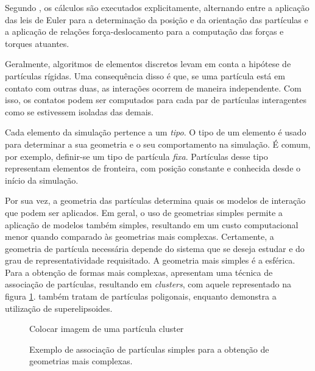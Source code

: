 Segundo , os cálculos são executados explicitamente, alternando entre a aplicação das leis de Euler para a determinação da posição e da orientação das partículas e a aplicação de relações força-deslocamento para a computação das forças e torques atuantes.

Geralmente, algoritmos de elementos discretos levam em conta a hipótese de partículas rígidas. Uma consequência disso é que, se uma partícula está em contato com outras duas, as interações ocorrem de maneira independente. Com isso, os contatos podem ser computados para cada par de partículas interagentes como se estivessem isoladas das demais.

Cada elemento da simulação pertence a um \textit{tipo}. O tipo de um elemento é usado para determinar a sua geometria e o seu comportamento na simulação. É comum, por exemplo, definir-se um tipo de partícula \textit{fixa}. Partículas desse tipo representam elementos de fronteira, com posição constante e conhecida desde o início da simulação.  

Por sua vez, a geometria das partículas determina quais os modelos de interação que podem ser aplicados. Em geral, o uso de geometrias simples permite a aplicação de modelos também simples, resultando em um custo computacional menor quando comparado às geometrias mais complexas. Certamente, a geometria de partícula necessária depende do sistema que se deseja estudar e do grau de representatividade requisitado. A geometria mais simples é a esférica. Para a obtenção de formas mais complexas,  apresentam uma técnica de associação de partículas, resultando em \textit{clusters}, com aquele representado na figura \ref{fig:cluster_particle}.  também tratam de partículas poligonais, enquanto  demonstra a utilização de superelipsoides.

\begin{figure}[h]
	\caption{Exemplo de associação de partículas simples para a obtenção de geometrias mais complexas.}
	\begin{center}
		\alert{Colocar imagem de uma partícula cluster}
	\end{center}
	\label{fig:cluster_particle}
\end{figure}


